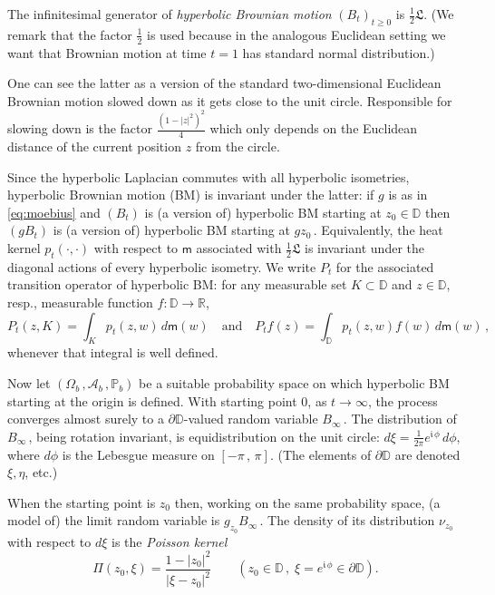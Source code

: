 \documentclass[12pt]{amsart}
\newcommand\A{\mathcal A}
\newcommand\AND{\quad\text{and}\quad}
\newcommand\DD{\mathbb D}
\newcommand\gm{g}
\newcommand\im{\mathfrak{i}\,}
\newcommand\Lap{\mathfrak{L}}
\newcommand\mm{\mathsf m}
\newcommand\Poiss{\Pi}
\newcommand\Prob{\mathbb P}
\newcommand\R{\mathbb R}
\numberwithin{theorem}{section}
\theoremstyle{definition}
\begin{document}
The infinitesimal generator of \emph{hyperbolic Brownian motion} $(B_t)_{t \ge 0}$ is $\frac{1}{2}\Lap$.
(We remark that the factor $\frac12$ is used because in the analogous Euclidean setting we want 
that Brownian motion at time $t=1$ has standard normal distribution.)

One can see the latter
as a version of the standard two-dimensional Euclidean Brownian motion
slowed down as it gets close to the unit circle.
Responsible for slowing down is the factor $\frac{(1-|z|^2)^2}{4}$ which only depends on
the Euclidean distance of the current position $z$ from the circle. 

Since the hyperbolic Laplacian commutes with all hyperbolic isometries, 
hyperbolic Brownian motion (BM) is invariant under the latter: if $\gm$ is as in \eqref{eq:moebius}
and $(B_t)$ is (a version of) hyperbolic BM starting at $z_0 \in \DD$ then $(\gm B_t)$ is 
(a version of) hyperbolic BM starting at $\gm z_0\,$.
Equivalently, the heat kernel  $p_t(\cdot,\cdot)$
with respect to $\mm$ associated with $\frac12 \Lap$ is invariant under the diagonal
actions of every hyperbolic isometry. We write $P_t$ for the associated transition 
operator of hyperbolic BM: for any measurable set $K \subset \DD$
and  $z \in \DD$, resp., measurable function $f: \DD \to \R$,
\begin{equation}\label{eq:Pt}
P_t(z,K) = \int_{K} p_t(z,w)\, d\mm(w) \AND
P_tf(z) = \int_{\DD} p_t(z,w)f(w)\, d\mm(w)\,,
\end{equation}
whenever that integral is well defined.

Now let $(\Omega_b\,, \A_b\,, \Prob_b)$ be a suitable probability space on which 
hyperbolic BM starting at the origin is defined. With starting point $0$, as $t \to \infty$, 
the process converges almost surely to a $\partial \DD$-valued random variable $B_{\infty}\,$.
The distribution of $B_{\infty}\,$, being rotation invariant, is equidistribution on the unit circle:
$d\xi = \frac{1}{2\pi} e^{\im\phi} \,d\phi$, where $d\phi$ is the Lebesgue measure
on $[-\pi\,,\,\pi]$. (The elements of $\partial \DD$ are denoted $\xi, \eta$, etc.) 


When the starting point is $z_0$ then, working on the same probability space, (a model of) 
the limit random variable is $\gm_{z_0} B_{\infty}\,$. The density of its distribution $\nu_{z_0}$ 
with respect to $d\xi$ is the \emph{Poisson kernel}
\begin{equation}\label{eq:poisson}
\Poiss(z_0,\xi) = \frac{1 - |z_0|^2}{|\xi - z_0|^2} \qquad (z_0 \in \DD\,,\; \xi 
 = e^{\im \phi} \in \partial \DD).
\end{equation} 
\end{document}
